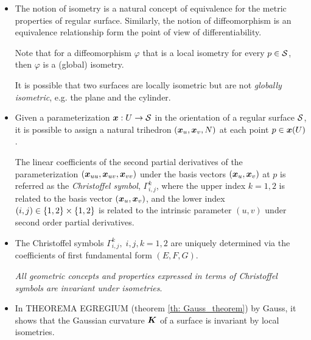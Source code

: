 \documentclass[11pt]{article}
\begin{document}
\begin{itemize}
\item  \begin{remark}
The notion of isometry is a natural concept of equivalence for the metric properties of regular surface. Similarly, the notion of diffeomorphism is an equivalence relationship form the point of view of differentiability. 

Note that for a diffeomorphism $\varphi$ that is a local isometry for every $p\in {\mathcal S}$, then $\varphi$ is a (global) isometry. 

It is possible that two surfaces are locally isometric but are not \emph{globally isometric}, e.g. the plane and the cylinder. \\
\end{remark}

\item Given a parameterization $\boldsymbol{x}: U\rightarrow {\mathcal S}$ in the orientation of a regular surface ${\mathcal S}$, it is possible to assign a natural trihedron $(\boldsymbol{x}_{u}, \boldsymbol{x}_{v}, N)$ at each point $p\in \boldsymbol{x}(U)$. 

\begin{definition}  The linear coefficients of the second partial derivatives of the parameterization $(\boldsymbol{x}_{uu}, \boldsymbol{x}_{uv}, \boldsymbol{x}_{vv})$ under the basis vectors $(\boldsymbol{x}_{u}, \boldsymbol{x}_{v})$ at $p$ is referred as the \emph{Christoffel symbol}, $\Gamma_{i,j}^{k}$, where the upper index $k=1,2$ is related to the basis vector $(\boldsymbol{x}_{u}, \boldsymbol{x}_{v})$, and the lower index $(i,j) \in \left\{1,2\right\}\times \left\{1,2\right\}$ is related to the intrinsic parameter $(u,v)$ under second order partial derivatives. 
\end{definition}


\item   \begin{remark}
The Christoffel symbols $\Gamma_{i,j}^{k},\; i,j,k=1,2$ are uniquely determined via the coefficients of first fundamental form $(E,F,G)$. 

\emph{All geometric concepts and properties expressed in terms of Christoffel symbols are invariant under isometries}.
\end{remark}

\item  \begin{remark}
 In THEOREMA EGREGIUM (theorem \ref{th: Gauss_theorem}) by Gauss,  it shows that the Gaussian curvature $\boldsymbol{K}$ of a surface is invariant by local isometries. 


\end{remark}
\end{itemize}
\end{document}
